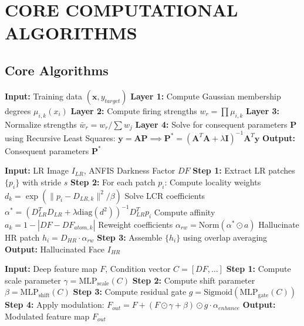 \chapter{CORE COMPUTATIONAL ALGORITHMS}

\section{Core Algorithms}

\begin{algorithm}
\caption{ANFIS Hybrid Learning (Forward Pass)}
\begin{algorithmic}[1]
\STATE \textbf{Input:} Training data $(\mathbf{x}, y_{target})$
\STATE \textbf{Layer 1:} Compute Gaussian membership degrees $\mu_{i,k}(x_i)$
\STATE \textbf{Layer 2:} Compute firing strengths $w_r = \prod \mu_{i,k}$
\STATE \textbf{Layer 3:} Normalize strengths $\bar{w}_r = w_r / \sum w_j$
\STATE \textbf{Layer 4:} Solve for consequent parameters $\mathbf{P}$ using Recursive Least Squares:
\STATE \quad $\mathbf{y} = \mathbf{A} \mathbf{P} \implies \mathbf{P}^* = (\mathbf{A}^T \mathbf{A} + \lambda \mathbf{I})^{-1} \mathbf{A}^T \mathbf{y}$
\STATE \textbf{Output:} Consequent parameters $\mathbf{P}^*$
\end{algorithmic}
\end{algorithm}

\begin{algorithm}
\caption{ANFIS-Guided LCR Patch Hallucination}
\begin{algorithmic}[1]
\STATE \textbf{Input:} LR Image $I_{LR}$, ANFIS Darkness Factor $DF$
\STATE \textbf{Step 1:} Extract LR patches $\{p_i\}$ with stride $s$
\STATE \textbf{Step 2:} For each patch $p_i$:
\STATE \quad Compute locality weights $d_k = \exp(\|p_i - D_{LR,k}\|^2 / \beta)$
\STATE \quad Solve LCR coefficients $\alpha^* = (D_{LR}^T D_{LR} + \lambda \text{diag}(d^2))^{-1} D_{LR}^T p_i$
\STATE \quad Compute affinity $a_k = 1 - |DF - DF_{atom, k}|$
\STATE \quad Reweight coefficients $\alpha_{rw} = \text{Norm}(\alpha^* \odot a)$
\STATE \quad Hallucinate HR patch $h_i = D_{HR} \cdot \alpha_{rw}$
\STATE \textbf{Step 3:} Assemble $\{h_i\}$ using overlap averaging
\STATE \textbf{Output:} Hallucinated Face $I_{HR}$
\end{algorithmic}
\end{algorithm}

\begin{algorithm}
\caption{Spatial Feature Transform (SFT) Modulation}
\begin{algorithmic}[1]
\STATE \textbf{Input:} Deep feature map $F$, Condition vector $C = [DF, \dots]$
\STATE \textbf{Step 1:} Compute scale parameter $\gamma = \text{MLP}_{\text{scale}}(C)$
\STATE \textbf{Step 2:} Compute shift parameter $\beta = \text{MLP}_{\text{shift}}(C)$
\STATE \textbf{Step 3:} Compute residual gate $g = \text{Sigmoid}(\text{MLP}_{\text{gate}}(C))$
\STATE \textbf{Step 4:} Apply modulation: $F_{out} = F + (F \odot \gamma + \beta) \odot g \cdot \alpha_{enhance}$
\STATE \textbf{Output:} Modulated feature map $F_{out}$
\end{algorithmic}
\end{algorithm}

